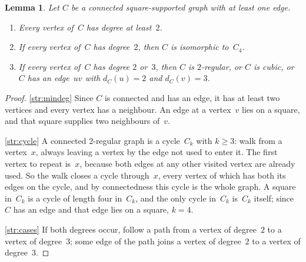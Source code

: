 \documentclass[11pt,letterpaper]{article}
\numberwithin{equation}{section}
\theoremstyle{plain}
\newtheorem{lemma}[theorem]{Lemma}
\theoremstyle{definition}
\theoremstyle{remark}
\begin{document}
\begin{lemma}\label{lem:structure}
Let $C$ be a connected square-supported graph with at least one edge.
\begin{enumerate}[label=\textup{(\roman*)}]
\item\label{str:mindeg} Every vertex of~$C$ has degree at least~$2$.
\item\label{str:cycle} If every vertex of~$C$ has degree~$2$, then $C$ is isomorphic to~$C_4$.
\item\label{str:cases} If every vertex of~$C$ has degree $2$ or~$3$, then $C$ is $2$-regular, or $C$ is cubic, or $C$ has an edge~$uv$ with $d_C(u)=2$ and $d_C(v)=3$.
\end{enumerate}
\end{lemma}

\begin{proof}
\ref{str:mindeg} Since $C$ is connected and has an edge, it has at least two vertices and every vertex has a neighbour. An edge at a vertex~$v$ lies on a square, and that square supplies two neighbours of~$v$.

\ref{str:cycle} A connected $2$-regular graph is a cycle~$C_k$ with $k\ge3$: walk from a vertex~$x$, always leaving a vertex by the edge not used to enter it. The first vertex to repeat is~$x$, because both edges at any other visited vertex are already used. So the walk closes a cycle through~$x$, every vertex of which has both its edges on the cycle, and by connectedness this cycle is the whole graph. A square in~$C_k$ is a cycle of length four in~$C_k$, and the only cycle in~$C_k$ is~$C_k$ itself; since $C$ has an edge and that edge lies on a square, $k=4$.

\ref{str:cases} If both degrees occur, follow a path from a vertex of degree~$2$ to a vertex of degree~$3$; some edge of the path joins a vertex of degree~$2$ to a vertex of degree~$3$.
\end{proof}
\end{document}
